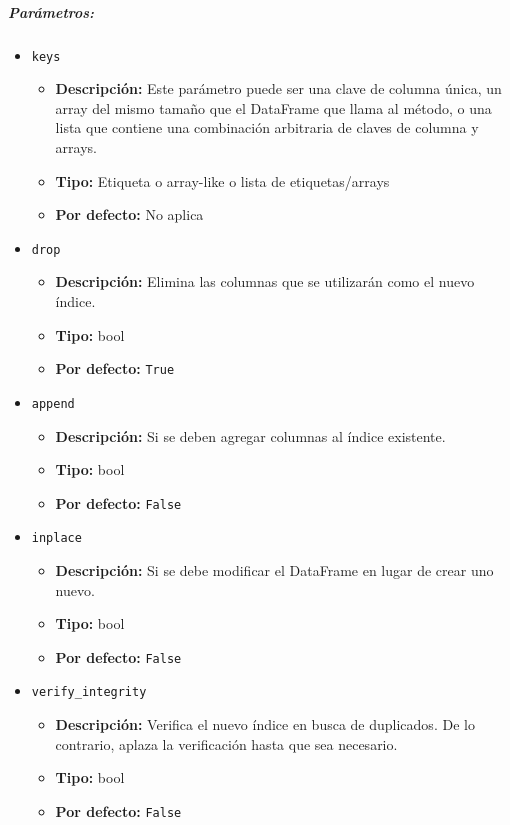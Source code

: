 \subparagraph{Parámetros:}
\begin{itemize}
    \item \texttt{keys}
          \begin{itemize}
              \item \textbf{Descripción:} Este parámetro puede ser una clave de
                    columna única, un array del mismo tamaño que el DataFrame que llama al método,
                    o una lista que contiene una combinación arbitraria de claves de columna y
                    arrays.
              \item \textbf{Tipo:} Etiqueta o array-like o lista de
                    etiquetas/arrays
              \item \textbf{Por defecto:} No aplica
          \end{itemize}

    \item \texttt{drop}
          \begin{itemize}
              \item \textbf{Descripción:} Elimina las columnas que se
                    utilizarán como el nuevo índice.
              \item \textbf{Tipo:} bool
              \item \textbf{Por defecto:} \texttt{True}
          \end{itemize}

    \item \texttt{append}
          \begin{itemize}
              \item \textbf{Descripción:} Si se deben agregar columnas al
                    índice existente.
              \item \textbf{Tipo:} bool
              \item \textbf{Por defecto:} \texttt{False}
          \end{itemize}

    \item \texttt{inplace}
          \begin{itemize}
              \item \textbf{Descripción:} Si se debe modificar el DataFrame en
                    lugar de crear uno nuevo.
              \item \textbf{Tipo:} bool
              \item \textbf{Por defecto:} \texttt{False}
          \end{itemize}

    \item \texttt{verify\_integrity}
          \begin{itemize}
              \item \textbf{Descripción:} Verifica el nuevo índice en busca de
                    duplicados. De lo contrario, aplaza la verificación hasta que sea necesario.
              \item \textbf{Tipo:} bool
              \item \textbf{Por defecto:} \texttt{False}
          \end{itemize}
\end{itemize}


